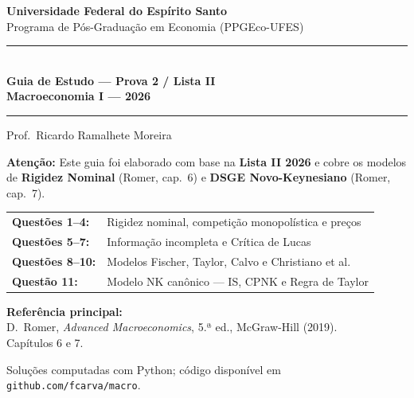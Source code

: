 \documentclass[12pt, a4paper]{article}
\begin{document}

\begin{titlepage}
\begin{center}
\vspace*{1.5cm}
{\Large\bfseries Universidade Federal do Espírito Santo}\\[0.5em]
{\large Programa de Pós-Graduação em Economia (PPGEco-UFES)}\\[2em]

\rule{\linewidth}{1.2pt}\\[0.8em]
{\LARGE\bfseries\color{cyanrbc} Guia de Estudo --- Prova 2 / Lista II\\[0.4em]
\large Macroeconomia I --- 2026}\\[0.8em]
\rule{\linewidth}{1.2pt}

\vspace{1em}
{\large Prof.\ Ricardo Ramalhete Moreira}

\vspace{1.5em}
\begin{tcolorbox}[standard, colback=provabg, colframe=provaborder, width=0.88\textwidth,
  arc=4pt, boxrule=1.2pt, left=8pt, right=8pt, top=6pt, bottom=6pt]
\centering
\textbf{\textcolor{provaborder}{Atenção:}} Este guia foi elaborado com base na
\textbf{Lista II 2026} e cobre os modelos de
\textbf{Rigidez Nominal} (Romer, cap.\ 6) e \textbf{DSGE Novo-Keynesiano}
(Romer, cap.\ 7).
\end{tcolorbox}

\vspace{1.5em}
\begin{tabular}{ll}
\textbf{Questões 1--4:}  & Rigidez nominal, competição monopolística e preços \\[0.4em]
\textbf{Questões 5--7:}  & Informação incompleta e Crítica de Lucas \\[0.4em]
\textbf{Questões 8--10:} & Modelos Fischer, Taylor, Calvo e Christiano et al. \\[0.4em]
\textbf{Questão 11:}     & Modelo NK canônico --- IS, CPNK e Regra de Taylor
\end{tabular}

\vspace{1.5em}
\begin{tcolorbox}[standard, colback=boxbg, colframe=boxborder, width=0.88\textwidth,
  arc=4pt, boxrule=1pt, left=8pt, right=8pt, top=6pt, bottom=6pt]
\centering
\textbf{Referência principal:} \\[0.3em]
D.\ Romer, \textit{Advanced Macroeconomics}, 5.ª ed., McGraw-Hill (2019). \\
Capítulos 6 e 7.
\end{tcolorbox}

\vfill
{\small Soluções computadas com Python; código disponível em
\texttt{github.com/fcarva/macro}.}
\end{center}
\end{titlepage}
\end{document}
